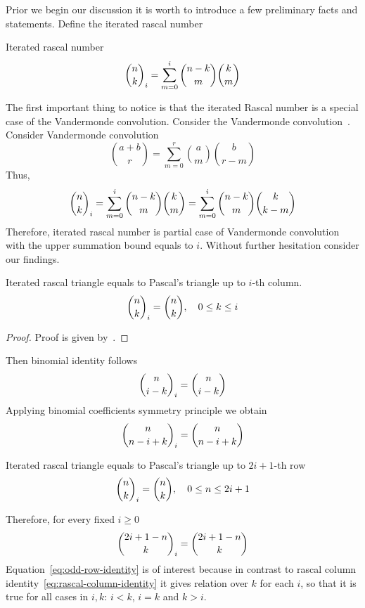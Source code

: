 ﻿Prior we begin our discussion it is worth to introduce a few preliminary facts and statements.
Define the iterated rascal number
\begin{definition}
    Iterated rascal number~\cite{gregory2023iterated}
    \begin{align}
        \binom{n}{k}_{i} = \sum_{m=0}^{i} \binom{n-k}{m} \binom{k}{m}
    \end{align}
\end{definition}
The first important thing to notice is that the iterated Rascal number is a special case of the Vandermonde convolution.
Consider the Vandermonde convolution~\cite{andrews1999special}.
Consider Vandermonde convolution
\begin{equation*}
    \binom{a+b}{r} = \sum_{m=0}^{r} \binom{a}{m} \binom{b}{r-m}
\end{equation*}
Thus,
\begin{equation}
    \binom{n}{k}_{i} = \sum_{m=0}^{i} \binom{n-k}{m} \binom{k}{m} = \sum_{m=0}^{i} \binom{n-k}{m} \binom{k}{k-m}
    \label{eq:rascal-vandermonde-convolution}
\end{equation}
Therefore, iterated rascal number is partial case of Vandermonde convolution with the upper summation bound equals to $i$.
Without further hesitation consider our findings.
\begin{proposition}
    Iterated rascal triangle equals to Pascal's triangle up to $i$-th column.
    \begin{equation}
        \binom{n}{k}_{i} = \binom{n}{k}, \quad 0 \leq k \leq i\label{eq:rascal-column-identity}
    \end{equation}
    \begin{proof}
        Proof is given by~\cite{gregory2023iterated}.
    \end{proof}
\end{proposition}
Then binomial identity follows
\begin{align*}
    \binom{n}{i-k}_{i} = \binom{n}{i-k}
\end{align*}
Applying binomial coefficients symmetry principle we obtain
\begin{align*}
    \binom{n}{n-i+k}_{i} = \binom{n}{n-i+k}
\end{align*}
\begin{proposition}
    \label{prop:odd-row-proposition}
    Iterated rascal triangle equals to Pascal's triangle up to $2i+1$-th row
    \begin{align*}
        \binom{n}{k}_{i} = \binom{n}{k}, \quad 0 \leq n \leq 2i+1
    \end{align*}
\end{proposition}
Therefore, for every fixed $i \geq 0$
\begin{equation}
    \binom{2i+1-n}{k}_{i} = \binom{2i+1-n}{k}
    \label{eq:odd-row-identity}
\end{equation}
Equation~\eqref{eq:odd-row-identity} is of interest because in contrast to rascal
column identity~\eqref{eq:rascal-column-identity} it gives relation over $k$ for each $i$,
so that it is true for all cases in $i,k$: $i < k$, $i=k$ and $k >i$.

